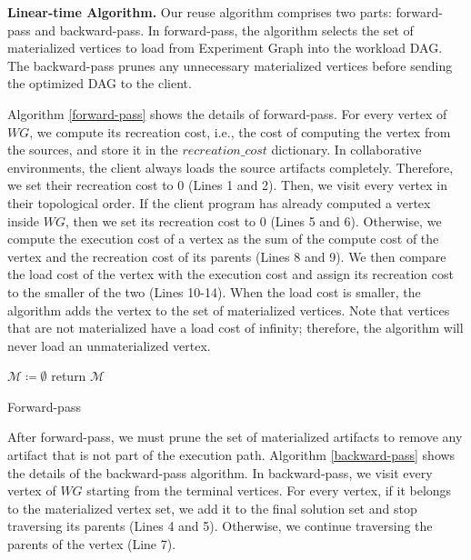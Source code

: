 \textbf{Linear-time Algorithm.}
Our reuse algorithm comprises two parts: forward-pass and backward-pass.
In forward-pass, the algorithm selects the set of materialized vertices to load from Experiment Graph into the workload DAG.
The backward-pass prunes any unnecessary materialized vertices before sending the optimized DAG to the client.

Algorithm \ref{forward-pass} shows the details of forward-pass.
For every vertex of $WG$, we compute its recreation cost, i.e., the cost of computing the vertex from the sources, and store it in the $recreation\_cost$ dictionary.
In collaborative environments, the client always loads the source artifacts completely.
Therefore, we set their recreation cost to 0 (Lines 1 and 2).
Then, we visit every vertex in their topological order.
If the client program has already computed a vertex inside $WG$, then we set its recreation cost to 0 (Lines 5 and 6).
Otherwise, we compute the execution cost of a vertex as the sum of the compute cost of the vertex and the recreation cost of its parents (Lines 8 and 9).
We then compare the load cost of the vertex with the execution cost and assign its recreation cost to the smaller of the two (Lines 10-14).
When the load cost is smaller, the algorithm adds the vertex to the set of materialized vertices.
Note that vertices that are not materialized have a load cost of infinity; therefore, the algorithm will never load an unmaterialized vertex.

\begin{algorithm}[h]
$\mathcal{M} \coloneqq \emptyset$\;
return $\mathcal{M}$\;
\caption{Forward-pass}\label{forward-pass}
\end{algorithm}
After forward-pass, we must prune the set of materialized artifacts to remove any artifact that is not part of the execution path.
Algorithm \ref{backward-pass} shows the details of the backward-pass algorithm.
In backward-pass, we visit every vertex of $WG$ starting from the terminal vertices.
For every vertex, if it belongs to the materialized vertex set, we add it to the final solution set and stop traversing its parents (Lines 4 and 5).
Otherwise, we continue traversing the parents of the vertex (Line 7).

